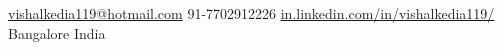 \documentclass[10pt,a4paper]{article}
\begin{document}
\sloppy  %



\nobreakvspace{0.3em}  %

\noindent\href{mailto:vishalkedia119@hotmail.com}{vishalkedia119\mbox{}@\mbox{}hotmail.com}\sbull
\textsmaller{+}91-7702912226\sbull
\href{http://in.linkedin.com/in/vishalkedia119}{in.linkedin.com/in/vishalkedia119/}
\\
Bangalore\sbull
India

\spacedhrule{0.9em}{-0.4em}  %

\end{document}
